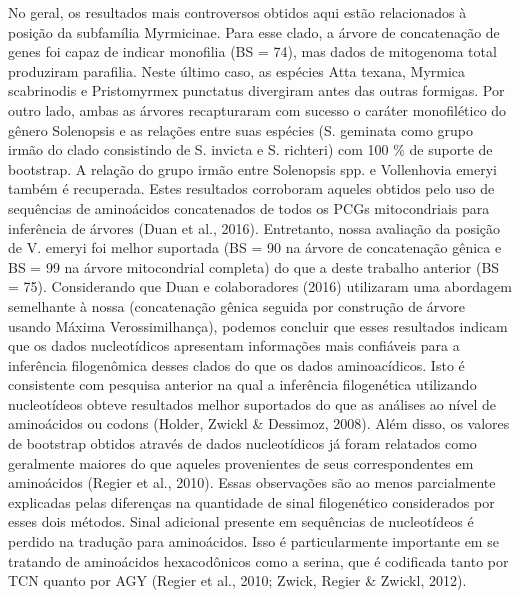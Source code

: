 \documentclass[../DISSERTACAO_MAIN.tex]{subfiles}
\begin{document}
	No geral, os resultados mais controversos obtidos aqui estão relacionados à posição da subfamília Myrmicinae. Para esse clado, a árvore de concatenação de genes foi capaz de indicar monofilia (BS = 74), mas dados de mitogenoma total produziram parafilia. Neste último caso, as espécies Atta texana, Myrmica scabrinodis e Pristomyrmex punctatus divergiram antes das outras formigas. Por outro lado, ambas as árvores recapturaram com sucesso o caráter monofilético do gênero Solenopsis e as relações entre suas espécies (S. geminata como grupo irmão do clado consistindo de S. invicta e S. richteri) com 100 \% de suporte de bootstrap. A relação do grupo irmão entre Solenopsis spp. e Vollenhovia emeryi também é recuperada. Estes resultados corroboram aqueles obtidos pelo uso de sequências de aminoácidos concatenados de todos os PCGs mitocondriais para inferência de árvores (Duan et al., 2016). Entretanto, nossa avaliação da posição de V. emeryi foi melhor suportada (BS = 90 na árvore de concatenação gênica e BS = 99 na árvore mitocondrial completa) do que a deste trabalho anterior (BS = 75). Considerando que Duan e colaboradores (2016) utilizaram uma abordagem semelhante à nossa (concatenação gênica seguida por construção de árvore usando Máxima Verossimilhança), podemos concluir que esses resultados indicam que os dados nucleotídicos apresentam informações mais confiáveis para a inferência filogenômica desses clados do que os dados aminoacídicos. Isto é consistente com pesquisa anterior na qual a inferência filogenética utilizando nucleotídeos obteve resultados melhor suportados do que as análises ao nível de aminoácidos ou codons (Holder, Zwickl \& Dessimoz, 2008). Além disso, os valores de bootstrap obtidos através de dados nucleotídicos já foram relatados como geralmente maiores do que aqueles provenientes de seus correspondentes em aminoácidos (Regier et al., 2010). Essas observações são ao menos parcialmente explicadas pelas diferenças na quantidade de sinal filogenético considerados por esses dois métodos. Sinal adicional presente em sequências de nucleotídeos é perdido na tradução para aminoácidos. Isso é particularmente importante em se tratando de aminoácidos hexacodônicos como a serina, que é codificada tanto por TCN quanto por AGY (Regier et al., 2010; Zwick, Regier \& Zwickl, 2012).
	
\end{document}
